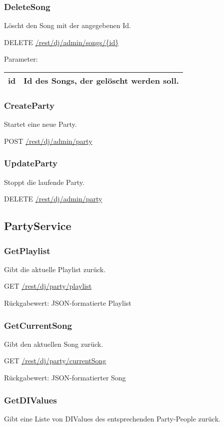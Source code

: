 \subsubsection{DeleteSong}
\label{service:DeleteSong}
Löscht den Song mit der angegebenen Id.

DELETE
\url{/rest/dj/admin/songs/{id}}

Parameter:\\
\begin{tabularx}{\textwidth}{|l|X|}
\hline id & Id des Songs, der gelöscht werden soll. \\ 
\hline 
\end{tabularx}

\subsubsection{CreateParty}
\label{service:CreateParty}
Startet eine neue Party.

POST
\url{/rest/dj/admin/party}

\subsubsection{UpdateParty}
\label{service:UpdateParty}
Stoppt die laufende Party.

DELETE
\url{/rest/dj/admin/party}

\subsection{PartyService}

\subsubsection{GetPlaylist}
\label{service:GetPlaylist}
Gibt die aktuelle Playlist zurück.

GET
\url{/rest/dj/party/playlist}

Rückgabewert: JSON-formatierte Playlist

\subsubsection{GetCurrentSong}
\label{service:GetCurrentSong}
Gibt den aktuellen Song zurück.

GET
\url{/rest/dj/party/currentSong}

Rückgabewert: JSON-formatierter Song

\subsubsection{GetDIValues}
\label{service:GetDIValues}
Gibt eine Liste von DIValues des entsprechenden Party-People zurück.

